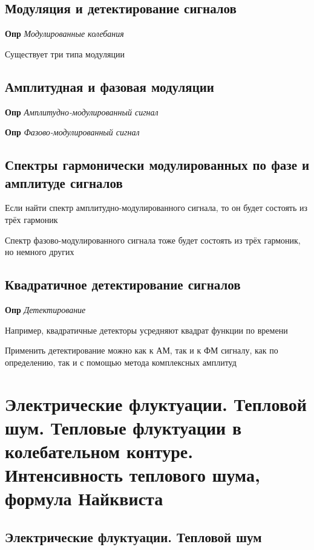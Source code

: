 \documentclass[a4paper, 14pt]{article}
\begin{document}
    \subsection{Модуляция и детектирование сигналов}
    
    \textbf{Опр} \textit{Модулированные колебания}
    
    Существует три типа модуляции
    
    \subsection{Амплитудная и фазовая модуляции}
    
    \textbf{Опр} \textit{Амплитудно-модулированный сигнал}
    
    \textbf{Опр} \textit{Фазово-модулированный сигнал}
    
    \subsection{Спектры гармонически модулированных по фазе и амплитуде сигналов}
    
    Если найти спектр амплитудно-модулированного сигнала, то он будет состоять из трёх гармоник
    
    Спектр фазово-модулированного сигнала тоже будет состоять из трёх гармоник, но немного других
    
    \subsection{Квадратичное детектирование сигналов}
    
    \textbf{Опр} \textit{Детектирование}
    
    Например, квадратичные детекторы усредняют квадрат функции по времени
    
    Применить детектирование можно как к АМ, так и к ФМ сигналу, как по определению, так и с помощью метода
    комплексных амплитуд
    
    \section{Электрические флуктуации.
    Тепловой шум.
    Тепловые флуктуации в колебательном контуре.
    Интенсивность теплового шума, формула Найквиста}
    
    \subsection{Электрические флуктуации. Тепловой шум}
    
\end{document}
